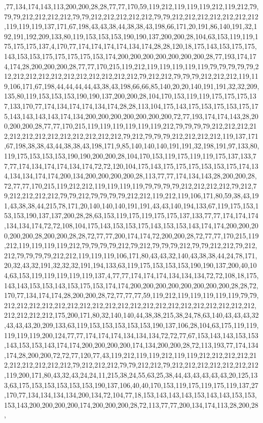 ,77,134,174,143,113,200,200,28,28,77,77,170,59,119,212,119,119,119,212,119,212,79,79,79,212,212,212,212,79,79,212,212,212,212,212,79,79,212,212,212,212,212,212,212,119,119,119,137,171,67,198,43,43,38,44,38,38,43,198,66,171,20,191,86,140,191,32,192,191,192,209,133,80,119,153,153,153,190,190,137,200,200,28,104,63,153,119,119,175,175,175,137,4,170,77,174,174,174,174,134,174,28,28,120,18,175,143,153,175,175,143,153,153,175,175,175,175,153,174,200,200,200,200,200,200,200,28,77,193,174,174,174,28,200,200,200,28,77,77,170,215,119,212,119,119,119,119,119,79,79,79,79,79,212,212,212,212,212,212,212,212,212,212,212,79,212,212,79,79,79,212,212,212,119,119,106,171,67,198,44,44,44,44,43,38,43,198,66,66,85,140,20,20,140,191,191,32,32,209,135,80,119,153,153,153,190,190,137,200,200,28,104,170,153,119,119,175,175,175,137,133,170,77,174,134,174,174,134,174,28,28,113,104,175,143,175,153,175,153,175,175,143,143,143,143,174,134,200,200,200,200,200,200,200,72,77,193,174,174,143,28,200,200,200,28,77,77,170,215,119,119,119,119,119,119,212,79,79,79,79,212,212,212,212,212,212,212,212,212,212,212,212,212,79,212,79,79,79,212,212,212,212,119,137,171,67,198,38,38,43,44,38,38,43,198,171,9,85,140,140,140,191,191,32,198,191,97,133,80,119,175,153,153,153,190,190,200,200,28,104,170,153,119,175,119,119,175,137,133,77,77,174,134,174,174,134,174,72,72,120,104,175,143,175,175,175,153,153,175,174,134,134,134,174,174,200,134,200,200,200,200,28,113,77,77,174,134,143,28,200,200,28,72,77,77,170,215,119,212,212,119,119,119,119,79,79,79,79,212,212,212,212,79,212,79,212,212,212,212,79,79,212,79,79,79,79,212,212,119,212,119,106,171,80,59,38,43,191,43,38,38,44,215,78,171,20,140,140,140,191,191,43,43,140,194,133,67,119,175,153,153,153,190,137,137,200,28,28,63,153,119,175,119,175,175,137,133,77,77,174,174,174,134,134,174,72,72,108,104,175,143,153,153,175,143,153,153,143,174,174,200,200,200,200,200,28,200,200,28,28,72,77,77,200,174,174,72,200,200,28,72,77,77,170,215,119,212,119,119,119,119,212,79,79,79,79,212,79,212,79,79,79,212,79,79,212,212,79,212,212,79,79,79,79,212,212,119,119,119,106,171,80,43,43,32,140,43,38,38,44,24,78,171,20,32,43,32,191,32,32,32,191,194,133,63,119,175,153,153,153,190,190,137,200,40,104,63,153,119,119,119,119,119,137,4,77,77,174,174,174,134,134,134,72,72,108,18,175,143,143,153,153,143,153,175,153,174,174,200,200,200,200,200,200,200,200,28,28,72,170,77,134,174,174,28,200,200,28,72,77,77,77,59,119,212,119,119,119,119,119,79,79,212,212,212,212,212,212,212,212,212,212,212,212,212,212,212,212,212,212,212,212,212,212,212,212,175,200,171,80,32,140,140,44,38,38,215,38,24,78,63,140,43,43,43,32,43,43,43,20,209,133,63,119,153,153,153,153,153,190,137,106,28,104,63,175,119,119,119,119,119,200,124,77,77,174,174,174,134,134,134,72,72,77,67,153,143,143,153,153,143,153,153,143,174,174,200,200,200,200,174,134,200,200,28,72,113,193,77,174,134,174,28,200,200,72,72,77,120,77,43,119,212,119,119,212,119,119,212,212,212,212,212,212,212,212,212,212,79,212,212,212,79,79,212,212,79,212,212,212,212,212,212,212,119,200,171,80,43,32,43,24,24,11,215,38,24,55,63,25,38,44,43,43,43,43,43,20,125,133,63,175,153,153,153,153,153,190,137,106,40,40,170,153,119,175,119,175,119,137,27,170,77,134,134,134,134,200,134,72,104,77,18,153,143,143,143,153,143,143,153,153,153,143,200,200,200,200,174,200,200,200,28,72,113,77,77,200,134,174,113,28,200,28,
